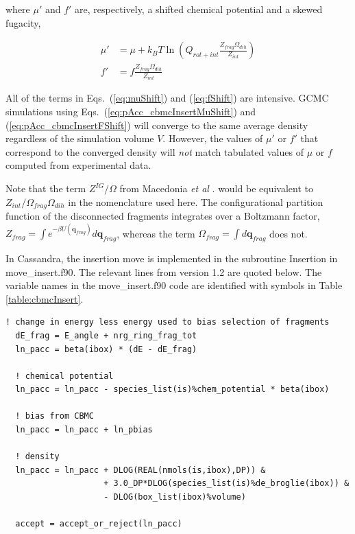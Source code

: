 where $\mu'$ and $f'$ are, respectively, a shifted chemical potential and a skewed fugacity,

\begin{align}
\label{eq:muShift}
\mu'&=\mu+k_BT\ln\left( Q_{rot+int} \frac{Z_{frag}\Omega_{dih}}{Z_{int}} \right) \\
\label{eq:fShift}
f'&= f \frac{Z_{frag}\Omega_{dih}}{Z_{int}}
\end{align}

All of the terms in Eqs.\ (\ref{eq:muShift}) and (\ref{eq:fShift}) are intensive. GCMC simulations using Eqs.\ (\ref{eq:pAcc_cbmcInsertMuShift}) and (\ref{eq:pAcc_cbmcInsertFShift}) will converge to the same average density regardless of the simulation volume $V$. However, the values of $\mu'$ or $f'$ that correspond to the converged density will {\em not} match tabulated values of $\mu$ or $f$ computed from experimental data.

Note that the term $Z^{IG}/\Omega$ from Macedonia {\em et al} \cite{Macedonia:1999}. would be equivalent to $Z_{int}/\Omega_{frag}\Omega_{dih}$ in the nomenclature used here. The configurational partition function of the disconnected fragments integrates over a Boltzmann factor, $Z_{frag} = \int e^{-\beta U(\mathbf{q}_{frag})} d\mathbf{q}_{frag}$, whereas the term $\Omega_{frag} = \int d\mathbf{q}_{frag}$ does not.

In Cassandra, the insertion move is implemented in the subroutine Insertion in move\_insert.f90. The relevant lines from version 1.2 are quoted below. The variable names in the move\_insert.f90 code are identified with symbols in Table \ref{table:cbmcInsert}.

\begin{minipage}{\linewidth}
\begin{lstlisting}[firstnumber=335, caption=move\_insert.f90]
  ! change in energy less energy used to bias selection of fragments
  dE_frag = E_angle + nrg_ring_frag_tot
  ln_pacc = beta(ibox) * (dE - dE_frag)

  ! chemical potential
  ln_pacc = ln_pacc - species_list(is)%chem_potential * beta(ibox)

  ! bias from CBMC
  ln_pacc = ln_pacc + ln_pbias

  ! density
  ln_pacc = ln_pacc + DLOG(REAL(nmols(is,ibox),DP)) &
                    + 3.0_DP*DLOG(species_list(is)%de_broglie(ibox)) &
                    - DLOG(box_list(ibox)%volume)

  accept = accept_or_reject(ln_pacc)
\end{lstlisting}
\end{minipage}


